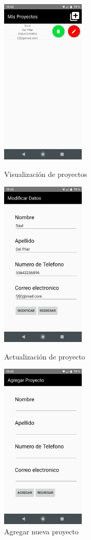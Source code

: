\begin{figure}[h!]
	\begin{minipage}{0.32\textwidth}
		\centering
		\includegraphics[width=4cm,height=8cm]{imagenes/desarrollo/app/proyectos.png}
		\caption{Visualización de proyectos}
		\label{fig:appreadproj}
	\end{minipage}\hfill
	\begin{minipage}{0.32\textwidth}
		\centering
		\includegraphics[width=4cm,height=8cm]{imagenes/desarrollo/app/update_proj.png}
		\caption{Actualización de proyecto}
		\label{fig:updateproj}
	\end{minipage}\hfill
	\begin{minipage}{0.32\textwidth}
		\centering
		\includegraphics[width=4cm,height=8cm]{imagenes/desarrollo/app/save_proj.png}
		\caption{Agregar nueva proyecto}
		\label{fig:addproj}
	\end{minipage}\hfill
\end{figure}

